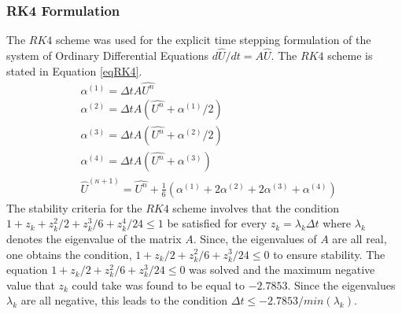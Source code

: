 \documentclass[12pt,dvipsnames]{article}
\begin{document}
\subsubsection{RK4 Formulation}
The $RK4$ scheme was used for the explicit time stepping formulation of the system of Ordinary Differential Equations $d\hat{U}/dt = A \hat{U}$. The $RK4$ scheme is stated in Equation \ref{eqRK4}.
\begin{equation}
    \begin{aligned}
        & \alpha^{(1)} = \Delta t A \hat{U^n} \\
        & \alpha^{(2)} = \Delta t A( \hat{U^n} +  \alpha^{(1)}/2 ) \\
        & \alpha^{(3)} = \Delta t A( \hat{U^n} +  \alpha^{(2)}/2 ) \\
        & \alpha^{(4)} = \Delta t A( \hat{U^n} +  \alpha^{(3)} ) \\
        & \hat{U}^{(n + 1)} = \hat{U^n} + \frac{1}{6} \left( \alpha^{(1)} + 2\alpha^{(2)} + 2\alpha^{(3)} + \alpha^{(4)} \right)
    \end{aligned}
    \label{eqRK4}
\end{equation}
The stability criteria for the $RK4$ scheme involves that the condition $1 + z_k + z_k^2/2 + z_k^3/6 + z_k^4/24 \leq 1$ be satisfied for every $z_k = \lambda_k \Delta t$ where $\lambda_k$ denotes the eigenvalue of the matrix $A$. Since, the eigenvalues of $A$ are all real, one obtains the condition, $1 + z_k/2 + z_k^2/6 + z_k^3/24 \leq 0$ to ensure stability. The equation $1 + z_k/2 + z_k^2/6 + z_k^3/24 \leq 0$ was solved and the maximum negative value that $z_k$ could take was found to be equal to $-2.7853$. Since the eigenvalues $\lambda_k$ are all negative, this leads to the condition $\Delta t \leq -2.7853/min(\lambda_k)$.
\end{document}
